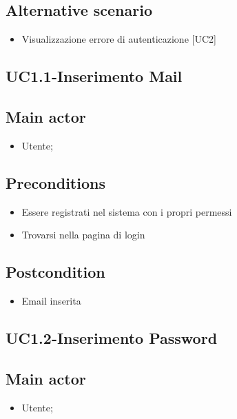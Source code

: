 \documentclass{article}
\begin{document}
        \subsection*{Alternative scenario}
            \begin{itemize}
                \item Visualizzazione errore di autenticazione [UC2]
            \end{itemize}
            
\subsection{UC1.1-Inserimento Mail}
    
     \subsection*{Main actor}
         \begin{itemize}
             \item Utente;
         \end{itemize}
     \subsection*{Preconditions} 
        \begin{itemize}
            \item Essere registrati nel sistema con i propri permessi
            \item Trovarsi nella pagina di login
        \end{itemize}
        \subsection*{Postcondition} 
        \begin{itemize}
            \item Email inserita
        \end{itemize}

\subsection{UC1.2-Inserimento Password}
    
     \subsection*{Main actor}
         \begin{itemize}
             \item Utente;
         \end{itemize}
\end{document}
